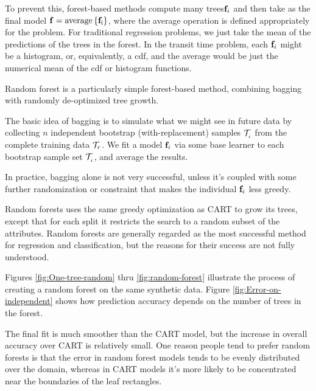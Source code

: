 \documentclass[11pt,openany,american,usenames,dvipsnames,svgnames,x11names,table,isodate]{article}
\numberwithin{equation}{section}
\numberwithin{figure}{section}
\begin{document}
To prevent this, forest-based methods compute many trees${\mathbf f}_{i}$
and then take as the final model ${\mathbf f}=\mathrm{{average}\left\{ {\mathbf f}_{i}\right\} }$,
where the average operation is defined appropriately for the problem.
For traditional regression problems, we just take the mean of the
predictions of the trees in the forest. In the transit time problem,
each ${\mathbf f}_{i}$ might be a histogram, or, equivalently, a cdf, and
the average would be just the numerical mean of the cdf or histogram
functions. 

Random forest is a particularly simple forest-based method, combining
bagging with randomly de-optimized tree growth.

The basic idea of bagging\label{ite:Bagging-(Random-Forests)} is
to simulate what we might see in future data by collecting $n$ independent
bootstrap (with-replacement) samples $\mathcal{T}_{_{i}}$ from the complete
training data $\mathcal{T}_r$. We fit a model ${\mathbf f}_{i}$ via some base
learner to each bootstrap sample set $\mathcal{T}_{_{i}}$, and average
the results.

In practice, bagging alone is not very successful, unless it's coupled
with some further randomization or constraint that makes the individual
${\mathbf f}_{i}$ less greedy. 

Random forests \cite{breiman-2001-machine-learning,hastie-tibshirani-friedman-2009}
uses the same greedy optimization as CART to grow its trees, except
that for each split it restricts the search to a random subset of
the attributes. Random forests are generally regarded as the most
successful method for regression and classification, but the reasons
for their success are not fully understood.

Figures \ref{fig:One-tree-random} thru \ref{fig:random-forest} illustrate
the process of creating a random forest on the same synthetic data.
Figure \ref{fig:Error-on-independent} shows how prediction accuracy
depends on the number of trees in the forest.

The final fit is much smoother than the CART model, but the increase
in overall accuracy over CART is relatively small. One reason people
tend to prefer random forests is that the error in random forest models
tends to be evenly distributed over the domain, whereas in CART models
it's more likely to be concentrated near the boundaries of the leaf
rectangles.
\end{document}
